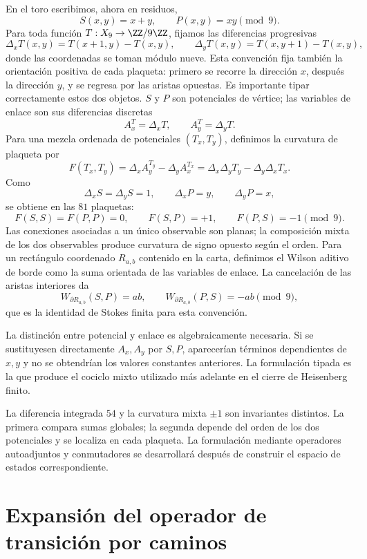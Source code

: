 En el toro escribimos, ahora en residuos,
\[
S(x,y)=x+y,
\qquad
P(x,y)=xy\pmod9.
\]
Para toda función \(T:X_9\to\ZZ/9\ZZ\), fijamos las diferencias progresivas
\[
 \Delta_xT(x,y)=T(x+1,y)-T(x,y),\qquad
 \Delta_yT(x,y)=T(x,y+1)-T(x,y),
\]
donde las coordenadas se toman módulo nueve. Esta convención fija también la
orientación positiva de cada plaqueta: primero se recorre la dirección
\(x\), después la dirección \(y\), y se regresa por las aristas opuestas.
Es importante tipar correctamente estos dos objetos. \(S\) y \(P\) son
potenciales de vértice; las variables de enlace son sus diferencias
discretas
\[
A_x^T=\Delta_xT,
\qquad
A_y^T=\Delta_yT.
\]
Para una mezcla ordenada de potenciales \((T_x,T_y)\), definimos la
curvatura de plaqueta por
\[
F(T_x,T_y)
=\Delta_x A_y^{T_y}-\Delta_y A_x^{T_x}
=\Delta_x\Delta_yT_y-\Delta_y\Delta_xT_x.
\]
Como
\[
\Delta_xS=\Delta_yS=1,
\qquad
\Delta_xP=y,
\qquad
\Delta_yP=x,
\]
se obtiene en las \(81\) plaquetas:
\[
F(S,S)=F(P,P)=0,
\qquad
F(S,P)=+1,
\qquad
F(P,S)=-1\pmod9.
\]
Las conexiones asociadas a un único observable son planas; la composición
mixta de los dos observables produce curvatura de signo opuesto según el
orden. Para un rectángulo coordenado \(R_{a,b}\) contenido
en la carta, definimos el Wilson aditivo de borde como la suma orientada de
las variables de enlace. La cancelación de las aristas interiores da
\[
 W_{\partial R_{a,b}}(S,P)=ab,\qquad
 W_{\partial R_{a,b}}(P,S)=-ab\pmod9,
\]
que es la identidad de Stokes finita para esta convención.

La distinción entre potencial y enlace es algebraicamente necesaria. Si se sustituyesen
directamente \(A_x,A_y\) por \(S,P\), aparecerían términos dependientes de
\(x,y\) y no se obtendrían los valores constantes anteriores. La formulación
tipada es la que produce el cociclo mixto utilizado más adelante en el cierre
de Heisenberg finito.

\begin{remark}
La diferencia integrada \(54\) y la curvatura mixta \(\pm1\) son invariantes
distintos. La primera compara sumas globales; la segunda depende del orden de
los dos potenciales y se localiza en cada plaqueta. La formulación mediante
operadores autoadjuntos y conmutadores se desarrollará después de construir el
espacio de estados correspondiente.
\end{remark}

\section{Expansión del operador de transición por caminos}

